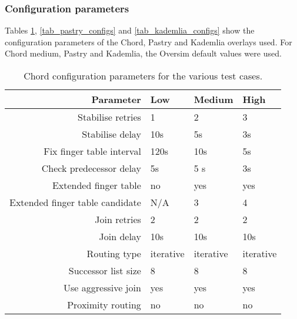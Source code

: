 \subsubsection{Configuration parameters}

Tables \ref{tab_chord_configs}, \ref{tab_pastry_configs} and \ref{tab_kademlia_configs} show the configuration parameters of the Chord, Pastry and Kademlia overlays used. For Chord medium, Pastry and Kademlia, the Oversim default values were used.

\begin{table}[htbp]
\centering
\begin{tabular}{|r|l|l|l|}
\hline
Parameter                       & Low  & Medium & High  \\
\hline
Stabilise retries               & 1    & 2      &  3    \\
Stabilise delay                 & 10s  & 5s     &  3s   \\
Fix finger table interval       & 120s & 10s    &  5s   \\
Check predecessor delay         & 5s   & 5 s    &  3s   \\
Extended finger table           & no   & yes    &  yes  \\
Extended finger table candidate & N/A  & 3      &  4    \\
\hline
Join retries                    & 2    & 2      & 2     \\
Join delay                      & 10s  & 10s    & 10s   \\
Routing type                    & iterative & iterative & iterative \\
Successor list size             & 8    & 8      & 8     \\
Use aggressive join             & yes  & yes    & yes   \\
Proximity routing               & no   & no     & no    \\
\hline
\end{tabular}
\caption{Chord configuration parameters for the various test cases.}
\label{tab_chord_configs}
\end{table}

